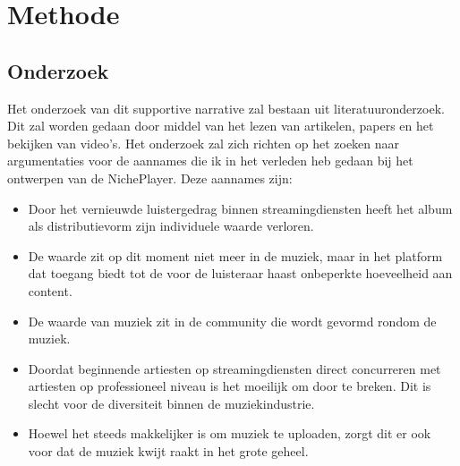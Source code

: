 \section{Methode}

\subsection{Onderzoek}

Het onderzoek van dit supportive narrative zal bestaan uit literatuuronderzoek. Dit zal worden gedaan door middel van het lezen van artikelen, papers en het bekijken van video's.
Het onderzoek zal zich richten op het zoeken naar argumentaties voor de aannames die ik in het verleden heb gedaan bij het ontwerpen van de NichePlayer. Deze aannames zijn:

\begin{itemize}
  \item Door het vernieuwde luistergedrag binnen streamingdiensten heeft het album als distributievorm zijn individuele waarde verloren.
  \item De waarde zit op dit moment niet meer in de muziek, maar in het platform dat toegang biedt tot de voor de luisteraar haast onbeperkte hoeveelheid aan content.
  \item De waarde van muziek zit in de community die wordt gevormd rondom de muziek.
  \item Doordat beginnende artiesten op streamingdiensten direct concurreren met artiesten op professioneel niveau is het moeilijk om door te breken. Dit is slecht voor de diversiteit binnen de muziekindustrie.
  \item Hoewel het steeds makkelijker is om muziek te uploaden, zorgt dit er ook voor dat de muziek kwijt raakt in het grote geheel.
\end{itemize}

